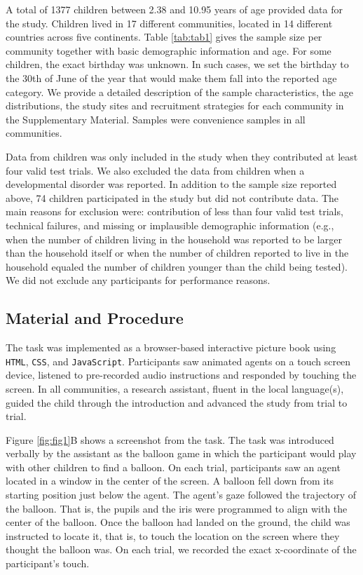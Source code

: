 \documentclass[
  man,floatsintext]{apa7}
\begin{document}
A total of 1377 children between 2.38 and 10.95 years of age provided data for the study. Children lived in 17 different communities, located in 14 different countries across five continents. Table \ref{tab:tab1} gives the sample size per community together with basic demographic information and age. For some children, the exact birthday was unknown. In such cases, we set the birthday to the 30th of June of the year that would make them fall into the reported age category. We provide a detailed description of the sample characteristics, the age distributions, the study sites and recruitment strategies for each community in the Supplementary Material. Samples were convenience samples in all communities.

Data from children was only included in the study when they contributed at least four valid test trials. We also excluded the data from children when a developmental disorder was reported. In addition to the sample size reported above, 74 children participated in the study but did not contribute data. The main reasons for exclusion were: contribution of less than four valid test trials, technical failures, and missing or implausible demographic information (e.g., when the number of children living in the household was reported to be larger than the household itself or when the number of children reported to live in the household equaled the number of children younger than the child being tested). We did not exclude any participants for performance reasons.

\hypertarget{material-and-procedure}{%
\subsection{Material and Procedure}\label{material-and-procedure}}

The task was implemented as a browser-based interactive picture book using \texttt{HTML}, \texttt{CSS}, and \texttt{JavaScript}. Participants saw animated agents on a touch screen device, listened to pre-recorded audio instructions and responded by touching the screen. In all communities, a research assistant, fluent in the local language(s), guided the child through the introduction and advanced the study from trial to trial.

Figure \ref{fig:fig1}B shows a screenshot from the task. The task was introduced verbally by the assistant as the balloon game in which the participant would play with other children to find a balloon. On each trial, participants saw an agent located in a window in the center of the screen. A balloon fell down from its starting position just below the agent. The agent's gaze followed the trajectory of the balloon. That is, the pupils and the iris were programmed to align with the center of the balloon. Once the balloon had landed on the ground, the child was instructed to locate it, that is, to touch the location on the screen where they thought the balloon was. On each trial, we recorded the exact x-coordinate of the participant's touch.
\end{document}
